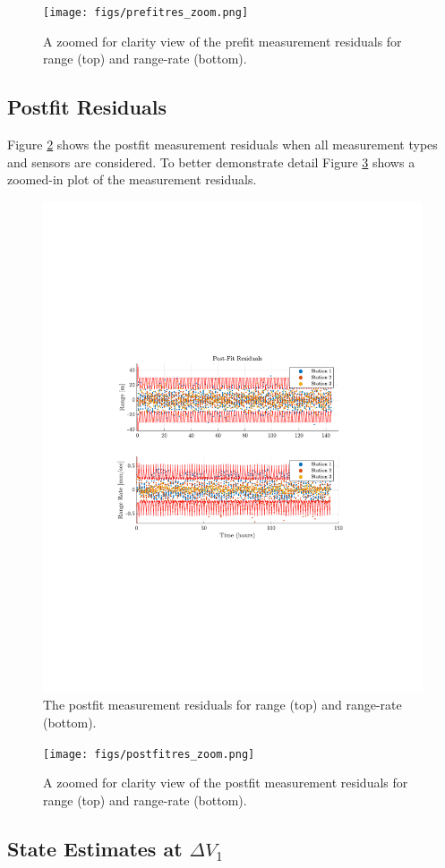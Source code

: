 \documentclass[11pt]{article}
\begin{document}
\begin{figure}[!htb]
	\centering
	\texttt{[image: figs/prefitres\_zoom.png]}
	\caption{A zoomed for clarity view of the prefit measurement residuals for range (top) and range-rate (bottom).}
	\label{fig:prefit_zoom}
\end{figure}

\subsection{Postfit Residuals}

Figure \ref{fig:postfit} shows the postfit measurement residuals when all measurement types and sensors are considered. To better demonstrate detail Figure \ref{fig:postfit_zoom} shows a zoomed-in plot of the measurement residuals.

\begin{figure}[!htb]
	\centering
	\includegraphics[clip,trim=4cm 8.5cm 4cm 8.5cm, width=.5\textwidth]{figs/postfit_res_final.pdf}
	\caption{The postfit measurement residuals for range (top) and range-rate (bottom).}
	\label{fig:postfit}
\end{figure}

\begin{figure}[!htb]
	\centering
	\texttt{[image: figs/postfitres\_zoom.png]}
	\caption{A zoomed for clarity view of the postfit measurement residuals for range (top) and range-rate (bottom).}
	\label{fig:postfit_zoom}
\end{figure}

\subsection{State Estimates at $\Delta V_1$}
\end{document}
